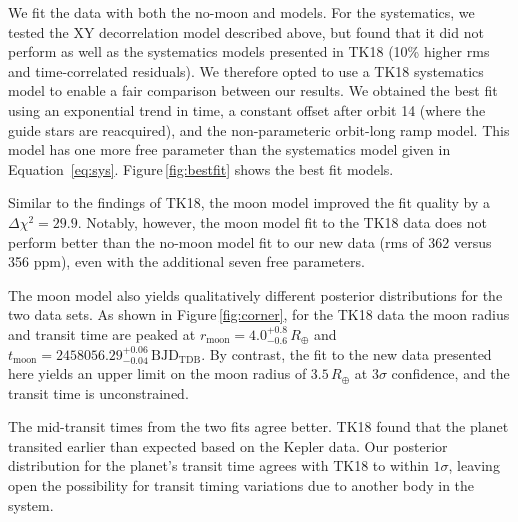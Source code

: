 \documentclass[twocolumn]{aastex62}
\begin{document}
We fit the data with both the no-moon and models.  For the systematics, we tested the XY decorrelation model described above, but found that it did not perform as well as the systematics models presented in TK18 (10\% higher rms and time-correlated residuals).  We therefore opted to use a TK18 systematics model to enable a fair comparison between our results. We obtained the best fit using an exponential trend in time, a constant offset after orbit 14 (where the guide stars are reacquired), and the non-parameteric orbit-long ramp model. This model has one more free parameter than the systematics model given in Equation~\ref{eq:sys}. Figure\,\ref{fig:bestfit} shows the best fit models. 

Similar to the findings of TK18, the moon model improved the fit quality by a $\Delta\chi^2 = 29.9$. Notably, however, the moon model fit to the TK18 data does not perform better than the no-moon model fit to our new data (rms of 362 versus 356 ppm), even with the additional seven free parameters.  %

The moon model also yields qualitatively different posterior distributions for the two data sets.  As shown in Figure\,\ref{fig:corner}, for the TK18 data the moon radius and transit time are peaked at $r_\mathrm{moon} = 4.0^{+0.8}_{-0.6}\,R_\oplus$  and $t_\mathrm{moon} =  2458056.29^{+0.06}_{-0.04}\,\mathrm{BJD_{TDB}}$. By contrast, the fit to the new data presented here yields an upper limit on the moon radius of $3.5\,R_\oplus$ at $3\sigma$ confidence, and the transit time is unconstrained.

The mid-transit times from the two fits agree better. TK18 found that the planet transited earlier than expected based on the Kepler data. Our posterior distribution for the planet's transit time agrees with TK18 to within $1\sigma$, leaving open the possibility for transit timing variations due to another body in the system.

\end{document}
